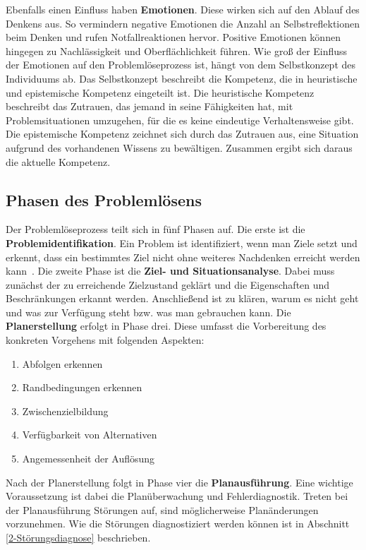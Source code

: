 Ebenfalls einen Einfluss haben \textbf{Emotionen}. Diese wirken sich auf den Ablauf des Denkens aus. So vermindern negative Emotionen die Anzahl an Selbstreflektionen beim Denken und rufen Notfallreaktionen hervor. Positive Emotionen können hingegen zu Nachlässigkeit und Oberflächlichkeit führen. Wie groß der Einfluss der Emotionen auf den Problemlöseprozess ist, hängt von dem Selbstkonzept des Individuums ab. Das Selbstkonzept beschreibt die Kompetenz, die in heuristische und epistemische Kompetenz eingeteilt ist. Die heuristische Kompetenz beschreibt das Zutrauen, das jemand in seine Fähigkeiten hat, mit Problemsituationen umzugehen, für die es keine eindeutige Verhaltensweise gibt. Die epistemische Kompetenz zeichnet sich durch das Zutrauen aus, eine Situation aufgrund des vorhandenen Wissens zu bewältigen. Zusammen ergibt sich daraus die aktuelle Kompetenz. \cite{Dorner1984}

\subsection{Phasen des Problemlösens}
\label{2:Phasen-Problemloesen}
Der Problemlöseprozess teilt sich in fünf Phasen auf. Die erste ist die \textbf{Problemidentifikation}. \glqq Ein Problem ist identifiziert, wenn man Ziele setzt und erkennt, dass ein bestimmtes Ziel nicht ohne weiteres Nachdenken erreicht werden kann\grqq \ \citep[146]{Betsch2011}. Die zweite Phase ist die \textbf{Ziel- und Situationsanalyse}. Dabei muss zunächst der zu erreichende Zielzustand geklärt und die Eigenschaften und Beschränkungen erkannt werden. Anschließend ist zu klären, warum es nicht geht und was zur Verfügung steht bzw. was man gebrauchen kann. Die \textbf{Planerstellung} erfolgt in Phase drei. Diese umfasst die Vorbereitung des konkreten Vorgehens mit folgenden Aspekten:
\begin{enumerate}
\item Abfolgen erkennen
\item Randbedingungen erkennen
\item Zwischenzielbildung
\item Verfügbarkeit von Alternativen
\item Angemessenheit der Auflösung
\end{enumerate}
Nach der Planerstellung folgt in Phase vier die \textbf{Planausführung}. Eine wichtige Voraussetzung ist dabei die Planüberwachung und Fehlerdiagnostik. Treten bei der Planausführung Störungen auf, sind möglicherweise Planänderungen vorzunehmen. Wie die Störungen diagnostiziert werden können ist in Abschnitt \ref{2-Störungsdiagnose} beschrieben.

